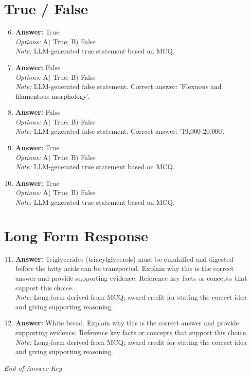 \documentclass[12pt]{article}
\begin{document}
\section*{True / False}
\begin{enumerate}[label=\arabic*.]
\setcounter{enumi}{5}
\item \textbf{Answer:} True
\\ \textit{Options:} A) True; B) False
\\ \textit{Note:} LLM-generated true statement based on MCQ.
\item \textbf{Answer:} False
\\ \textit{Options:} A) True; B) False
\\ \textit{Note:} LLM-generated false statement. Correct answer: 'Flexuous and filamentous morphology'.
\item \textbf{Answer:} False
\\ \textit{Options:} A) True; B) False
\\ \textit{Note:} LLM-generated false statement. Correct answer: '19,000-20,000'.
\item \textbf{Answer:} True
\\ \textit{Options:} A) True; B) False
\\ \textit{Note:} LLM-generated true statement based on MCQ.
\item \textbf{Answer:} True
\\ \textit{Options:} A) True; B) False
\\ \textit{Note:} LLM-generated true statement based on MCQ.
\end{enumerate}

\section*{Long Form Response}
\begin{enumerate}[label=\arabic*.]
\setcounter{enumi}{10}
\item \textbf{Answer:} Triglycerides (triacylglycerols) must be emulsified and digested before the fatty acids can be transported. Explain why this is the correct answer and provide supporting evidence. Reference key facts or concepts that support this choice.
\\ \textit{Note:} Long-form derived from MCQ; award credit for stating the correct idea and giving supporting reasoning.
\item \textbf{Answer:} White bread. Explain why this is the correct answer and provide supporting evidence. Reference key facts or concepts that support this choice.
\\ \textit{Note:} Long-form derived from MCQ; award credit for stating the correct idea and giving supporting reasoning.
\end{enumerate}

\vfill
\noindent\textit{End of Answer Key}
\end{document}
